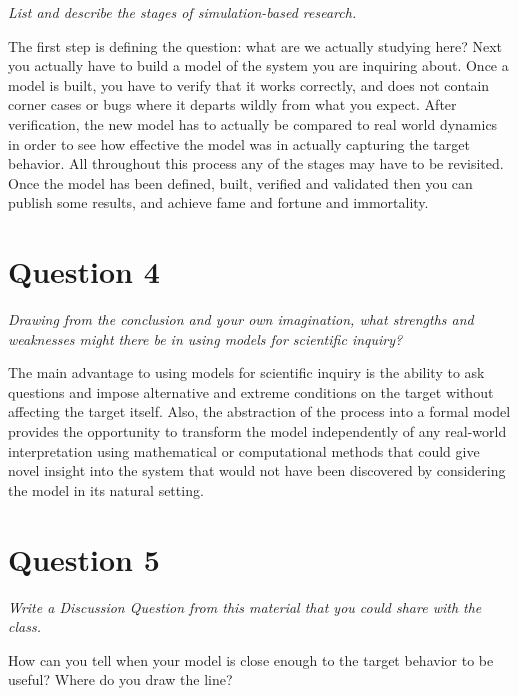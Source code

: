\documentclass[12pt]{article}
\begin{document}
\emph{List and describe the stages of simulation-based research.}

\vspace{4pt}

The first step is defining the question:  what are we actually studying here?  Next you actually have to build a model of the system you are inquiring about.  Once a model is built, you have to verify that it works correctly, and does not contain corner cases or bugs where it departs wildly from what you expect.  After verification, the new model has to actually be compared to real world dynamics in order to see how effective the model was in actually capturing the target behavior.  All throughout this process any of the stages may have to be revisited.  Once the model has been defined, built, verified and validated then you can publish some results, and achieve fame and fortune and immortality.

\section{Question 4}

\emph{Drawing from the conclusion and your own imagination, what strengths and weaknesses might there be in using models for scientific inquiry?}

\vspace{4pt}

The main advantage to using models for scientific inquiry is the ability to ask questions and impose alternative and extreme conditions on the target without affecting the target itself.  Also, the abstraction of the process into a formal model provides the opportunity to transform the model independently of any real-world interpretation using mathematical or computational methods that could give novel insight into the system that would not have been discovered by considering the model in its natural setting.

\section{Question 5}

\emph{Write a Discussion Question from this material that you could share with the class.}

\vspace{4pt}

How can you tell when your model is close enough to the target behavior to be useful?  Where do you draw the line?
\end{document}
